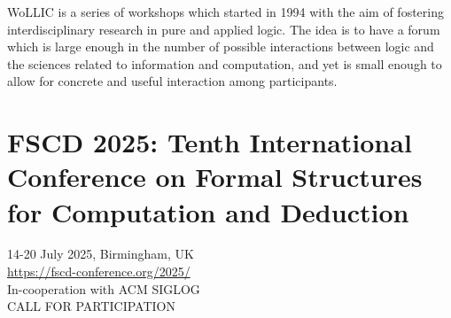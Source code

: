 \documentclass[prodmode,acmtecs]{acmsmall} %
\begin{document}
\begin{itemize}
  WoLLIC is a series of workshops which started in 1994 with the aim of fostering interdisciplinary research in pure and applied logic. The idea is to have a forum which is large enough in the number of possible interactions between logic and the sciences related to information and computation, and yet is small enough to allow for concrete and useful interaction among participants. 
 
\end{itemize}\section{FSCD 2025: Tenth International Conference on Formal Structures for Computation and Deduction}\label{FSCD2025}  14-20 July 2025, Birmingham, UK\\ 
  \href{https://fscd-conference.org/2025/}{https://fscd-conference.org/2025/}\\ 
  In-cooperation with ACM SIGLOG\\ 
CALL FOR PARTICIPATION 
\end{document}
